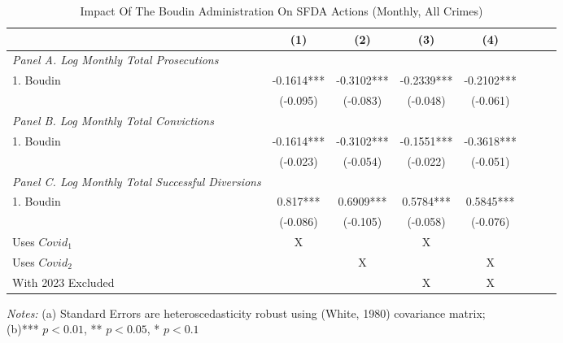 \begin{table}[htbp]
  \centering
  \caption{Impact Of The Boudin Administration On SFDA Actions (Monthly, All Crimes)}
  \label{tab:regression_ca_ac}
  \begin{tabular}{lccccccc}
    \toprule
    & \multirow{1}{*}{(1)} & \multirow{1}{*}{(2)} & \multirow{1}{*}{(3)} & \multirow{1}{*}{(4)} \\
    \midrule
    \textit{Panel A. Log Monthly Total Prosecutions}  &   &   &  &  \\
    1. Boudin  & -0.1614*** & -0.3102*** & -0.2339*** & -0.2102***\\
     & (-0.095) & (-0.083) & (-0.048) & (-0.061) \\ \addlinespace

    \textit{Panel B. Log Monthly Total Convictions}  &   &   &  &  \\
    1. Boudin  & -0.1614*** & -0.3102*** & -0.1551*** & -0.3618*** \\
     & (-0.023) & (-0.054) & (-0.022) & (-0.051) \\ \addlinespace

    \textit{Panel C. Log Monthly Total Successful Diversions}  &   &   &  &  \\
    1. Boudin  & 0.817*** & 0.6909*** & 0.5784*** & 0.5845***\\
     & (-0.086) & (-0.105) & (-0.058) & (-0.076) \\ \addlinespace
     Uses $Covid_1$ & X & & X & \\
     Uses $Covid_2$ & & X & & X \\
     With 2023 Excluded & & & X & X \\
    \bottomrule
  \end{tabular}

  \begin{flushleft}
    \textit{Notes:} (a) Standard Errors are heteroscedasticity robust using (White, 1980) covariance matrix; \\
    (b)*** $p<0.01$, ** $p<0.05$, * $p<0.1$
  \end{flushleft}
\end{table}